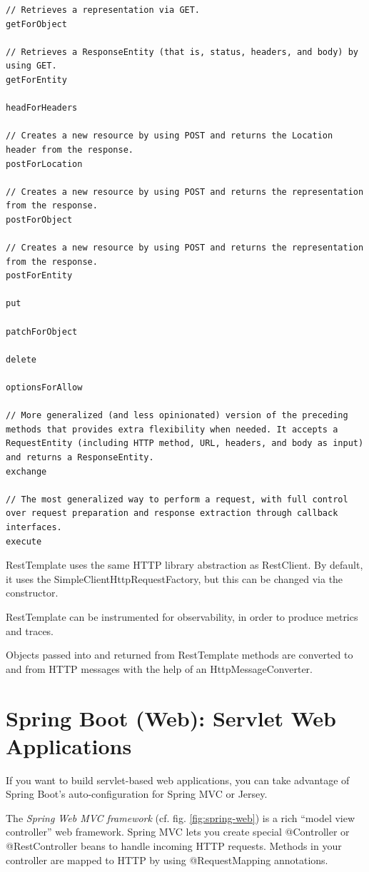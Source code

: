 \documentclass{scrartcl}
\begin{document}
\begin{lstlisting}
// Retrieves a representation via GET.
getForObject

// Retrieves a ResponseEntity (that is, status, headers, and body) by using GET.
getForEntity

headForHeaders

// Creates a new resource by using POST and returns the Location header from the response.
postForLocation

// Creates a new resource by using POST and returns the representation from the response.
postForObject

// Creates a new resource by using POST and returns the representation from the response.
postForEntity

put

patchForObject

delete

optionsForAllow

// More generalized (and less opinionated) version of the preceding methods that provides extra flexibility when needed. It accepts a RequestEntity (including HTTP method, URL, headers, and body as input) and returns a ResponseEntity.
exchange

// The most generalized way to perform a request, with full control over request preparation and response extraction through callback interfaces.
execute
\end{lstlisting}

RestTemplate uses the same HTTP library abstraction as RestClient. By default, it uses the SimpleClientHttpRequestFactory, but this can be changed via the constructor.

RestTemplate can be instrumented for observability, in order to produce metrics and traces.

Objects passed into and returned from RestTemplate methods are converted to and from HTTP messages with the help of an HttpMessageConverter.

\section{Spring Boot (Web): Servlet Web Applications}

If you want to build servlet-based web applications, you can take advantage of Spring Boot’s auto-configuration for Spring MVC or Jersey.

The \textit{Spring Web MVC framework} (cf. fig. \ref{fig:spring-web}) is a rich “model view controller” web framework.
Spring MVC lets you create special @Controller or @RestController beans to handle incoming HTTP requests. Methods in your controller are mapped to HTTP by using @RequestMapping annotations.
\end{document}
